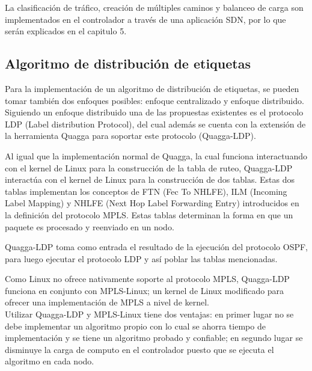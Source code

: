 La clasificaci\'on de tr\'afico, creación de m\'ultiples caminos y balanceo de carga son implementados en el controlador a través de una aplicaci\'on SDN, por lo que ser\'an explicados en el capitulo 5.

\subsection{Algoritmo de distribución de etiquetas}

Para la implementaci\'on de un algoritmo de distribución de etiquetas, se pueden tomar también dos enfoques posibles: enfoque centralizado y enfoque distribuido.\\

Siguiendo un enfoque distribuido una de las propuestas existentes es el protocolo LDP (Label distribution Protocol), del cual adem\'as se cuenta con la extensi\'on de la herramienta Quagga para soportar este protocolo (Quagga-LDP).

Al igual que la implementaci\'on normal de Quagga, la cual funciona interactuando con el kernel de Linux para la construcci\'on de la tabla de ruteo, Quagga-LDP interact\'ua con el kernel de Linux para la construcci\'on de dos tablas. Estas dos tablas implementan los conceptos de FTN (Fec To NHLFE), ILM (Incoming Label Mapping) y NHLFE (Next Hop Label Forwarding Entry) introducidos en la definición del protocolo MPLS.  Estas tablas determinan la forma en que un paquete es procesado y reenviado en un nodo.

Quagga-LDP toma como entrada el resultado de la ejecuci\'on del protocolo OSPF, para luego ejecutar el protocolo LDP y así poblar las tablas mencionadas.

Como Linux no ofrece nativamente soporte al protocolo MPLS, Quagga-LDP funciona en conjunto con MPLS-Linux; un kernel de Linux modificado para ofrecer una implementaci\'on de MPLS a nivel de kernel.\\

Utilizar Quagga-LDP y MPLS-Linux tiene dos ventajas: en primer lugar no se debe implementar un algoritmo propio con lo cual se ahorra tiempo de implementaci\'on y se tiene un algoritmo probado y confiable; en segundo lugar se disminuye la carga de computo en el controlador puesto que se ejecuta el algoritmo en cada nodo.


